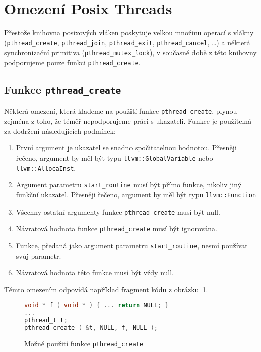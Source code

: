 \documentclass[10pt,a4paper,notitlepage]{report}
\begin{document}
\section{Omezení Posix Threads}
Přestože knihovna posixových vláken poskytuje velkou množinu operací s vlákny (\texttt{pthread\_create}, \texttt{pthread\_join}, \texttt{pthread\_exit}, \texttt{pthread\_cancel}, \ldots) a některá synchronizační primitiva (\texttt{pthread\_mutex\_lock}), v současné době z této knihovny podporujeme pouze funkci \texttt{pthread\_create}.

\subsection{Funkce \texttt{pthread\_create}}
Některá omezení, která klademe na použití funkce \texttt{pthread\_create}, plynou zejména z toho, že téměř nepodporujeme práci s ukazateli. Funkce je použitelná za dodržení následujících podmínek:

\begin{enumerate}
\item První argument je ukazatel se snadno spočitatelnou hodnotou. Přesněji řečeno, argument by měl být typu \texttt{llvm::GlobalVariable} nebo \texttt{llvm::AllocaInst}.
\item Argument parametru \texttt{start\_routine} musí být přímo funkce, nikoliv jiný funkční ukazatel. Přesněji řečeno, argument by měl být typu \texttt{llvm::Function}
\item Všechny ostatní argumenty funkce \texttt{pthread\_create} musí být null.
\item Návratová hodnota funkce \texttt{pthread\_create} musí být ignorována.
\item Funkce, předaná jako argument parametru \texttt{start\_routine}, nesmí používat svůj parametr.
\item Návratová hodnota této funkce musí být vždy null.
\end{enumerate}

Těmto omezením odpovídá například fragment kódu z obrázku~\ref{fig:pthread-create-usage-c}.
\begin{figure}[h!]
\begin{lstlisting}[language=C]
void * f ( void * ) { ... return NULL; }
...
pthread_t t;
pthread_create ( &t, NULL, f, NULL );
\end{lstlisting}
\caption{Možné použití funkce \texttt{pthread\_create}}
\label{fig:pthread-create-usage-c}
\end{figure}
\end{document}
